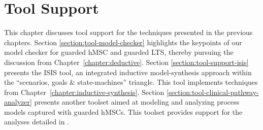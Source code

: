 \chapter{Tool Support\label{chapter:tool-support}}

This chapter discusses tool support for the techniques presented in the previous chapters. Section \ref{section:tool-model-checker} highlights the keypoints of our model checker for guarded hMSC and guarded LTS, thereby pursuing the discussion from Chapter~\ref{chapter:deductive}. Section \ref{section:tool-support-isis} presents the ISIS tool, an integrated inductive model-synthesis approach within the ``scenarios, goals $\&$ state-machines'' triangle. This tool implements techniques from Chapter~\ref{chapter:inductive-synthesis}. Section \ref{section:tool-clinical-pathway-analyzer} presents another toolset aimed at modeling and analyzing process models captured with guarded hMSCs. This toolset provides support for the analyses detailed in \cite{Damas:2011}.





